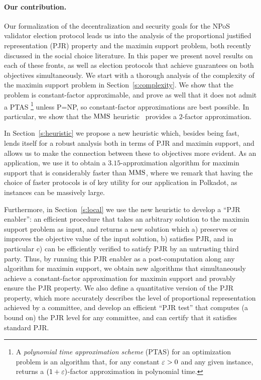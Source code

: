 \paragraph{Our contribution.}
Our formalization of the decentralization and security goals for the NPoS validator election protocol leads us into the analysis of the proportional justified representation (PJR) property and the maximin support problem, both recently discussed in the social choice literature. In this paper we present novel results on each of these fronts, as well as election protocols that achieve guarantees on both objectives simultaneously.
%
We start with a thorough analysis of the complexity of the maximin support problem in Section~\ref{s:complexity}. We show that the problem is constant-factor approximable, and prove as well that it does not admit a PTAS%
    \footnote{A \emph{polynomial time approximation scheme} (PTAS) for an optimization problem is an algorithm that, for any constant $\varepsilon>0$ and any given instance, returns a $(1+\varepsilon)$-factor approximation in polynomial time.}%
unless P=NP, so constant-factor approximations are best possible. In particular, we show that the $\operatorname{MMS}$ heuristic~\cite{sanchez2016maximin} provides a $2$-factor approximation. 

In Section~\ref{s:heuristic} we propose a new heuristic which, besides being fast, lends itself for a robust analysis both in terms of PJR and maximin support, and allows us to make the connection between these to objectives more evident. As an application, we use it to obtain a $3.15$-approximation algorithm for maximin support that is considerably faster than $\operatorname{MMS}$, where we remark that having the choice of faster protocols is of key utility for our application in Polkadot, as instances can be massively large. 

Furthermore, in Section~\ref{s:local} we use the new heuristic to develop a ``PJR enabler'': an efficient procedure that takes an arbitrary solution to the maximin support problem as input, and returns a new solution which a) preserves or improves the objective value of the input solution,  b) satisfies PJR, and in particular c) can be efficiently verified to satisfy PJR by an untrusting third party. Thus, by running this PJR enabler as a post-computation along any algorithm for maximin support, we obtain new algorithms that simultaneously achieve a constant-factor approximation for maximin support and provably ensure the PJR property. We also define a quantitative version of the PJR property, which more accurately describes the level of proportional representation achieved by a committee, and develop an efficient ``PJR test'' that computes (a bound on) the PJR level for any committee, and can certify that it satisfies standard PJR. 


